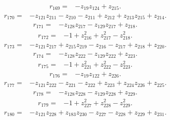 \begin{align*}
 r_{169}={}&-z_{19}z_{124}+z_{215} .
\end{align*}
\begin{align*}
 r_{170}={}&-z_{121}z_{211}-z_{210}-z_{211}+z_{212}+z_{213}z_{215}+z_{214} .
\end{align*}
\begin{align*}
 r_{171}={}&-z_{128}z_{217}-z_{129}z_{217}+z_{218} .
\end{align*}
\begin{align*}
 r_{172}={}&-1+z_{216}^{2}+z_{217}^{2}-z_{218}^{2} .
\end{align*}
\begin{align*}
 r_{173}={}&-z_{121}z_{217}+z_{215}z_{219}-z_{216}-z_{217}+z_{218}+z_{220} .
\end{align*}
\begin{align*}
 r_{174}={}&-z_{128}z_{222}-z_{129}z_{222}+z_{223} .
\end{align*}
\begin{align*}
 r_{175}={}&-1+z_{221}^{2}+z_{222}^{2}-z_{223}^{2} .
\end{align*}
\begin{align*}
 r_{176}={}&-z_{19}z_{122}+z_{226} .
\end{align*}
\begin{align*}
 r_{177}={}&-z_{121}z_{222}-z_{221}-z_{222}+z_{223}+z_{224}z_{226}+z_{225} .
\end{align*}
\begin{align*}
 r_{178}={}&-z_{128}z_{228}-z_{129}z_{228}+z_{229} .
\end{align*}
\begin{align*}
 r_{179}={}&-1+z_{227}^{2}+z_{228}^{2}-z_{229}^{2} .
\end{align*}
\begin{align*}
 r_{180}={}&-z_{121}z_{228}+z_{183}z_{230}-z_{227}-z_{228}+z_{229}+z_{231} .
\end{align*}
